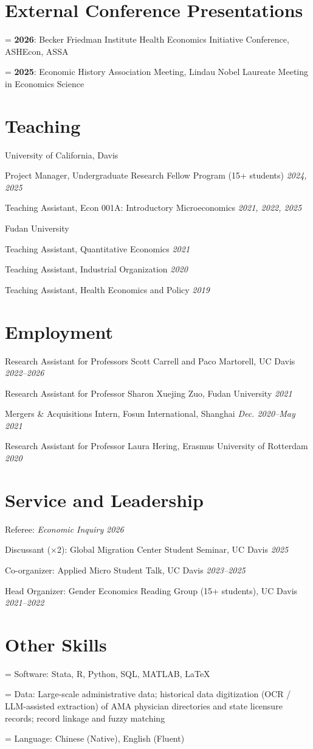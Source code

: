 \documentclass[11pt]{article}
\newlength{\bodyindent}
\newcommand{\cvrow}[2]{\noindent\hspace*{\bodyindent}#1 \hfill #2 \par}
\newcommand{\cvitem}[2]{\cvrow{#1}{\textit{#2}}}
\newcommand{\cvgrouphead}[1]{\par\vspace{3pt}\noindent\hspace*{\bodyindent}#1\par\vspace{1pt}}
\newcommand{\cvsubitem}[2]{\noindent\hspace*{\dimexpr\bodyindent+1.2em\relax}#1 \hfill \textit{#2} \par}
\newcommand{\bline}[1]{\par\noindent\hangindent=\bodyindent\hangafter=0 #1\par}
\begin{document}
\section{External Conference Presentations}
\bline{\textbf{2026}: Becker Friedman Institute Health Economics Initiative Conference, ASHEcon, ASSA}
\bline{\textbf{2025}: Economic History Association Meeting, Lindau Nobel Laureate Meeting in Economics Science}

\section{Teaching}
\cvgrouphead{University of California, Davis}
\cvsubitem{Project Manager, Undergraduate Research Fellow Program (15+ students)}{2024, 2025}
\cvsubitem{Teaching Assistant, Econ 001A: Introductory Microeconomics}{2021, 2022, 2025}
\cvgrouphead{Fudan University}
\cvsubitem{Teaching Assistant, Quantitative Economics}{2021}
\cvsubitem{Teaching Assistant, Industrial Organization}{2020}
\cvsubitem{Teaching Assistant, Health Economics and Policy}{2019}

\section{Employment}
\cvitem{Research Assistant for Professors Scott Carrell and Paco Martorell, UC Davis}{2022--2026}
\cvitem{Research Assistant for Professor Sharon Xuejing Zuo, Fudan University}{2021}
\cvitem{Mergers \& Acquisitions Intern, Fosun International, Shanghai}{Dec. 2020--May 2021}
\cvitem{Research Assistant for Professor Laura Hering, Erasmus University of Rotterdam}{2020}

\section{Service and Leadership}
\cvitem{Referee: \textit{Economic Inquiry}}{2026}
\cvitem{Discussant (×2): Global Migration Center Student Seminar, UC Davis}{2025}
\cvitem{Co-organizer: Applied Micro Student Talk, UC Davis}{2023--2025}
\cvitem{Head Organizer: Gender Economics Reading Group (15+ students), UC Davis}{2021--2022}

\section{Other Skills}
\bline{Software: Stata, R, Python, SQL, MATLAB, LaTeX}
\bline{Data: Large-scale administrative data; historical data digitization (OCR / LLM-assisted extraction) of AMA physician directories and state licensure records; record linkage and fuzzy matching}
\bline{Language: Chinese (Native), English (Fluent)}
\end{document}
